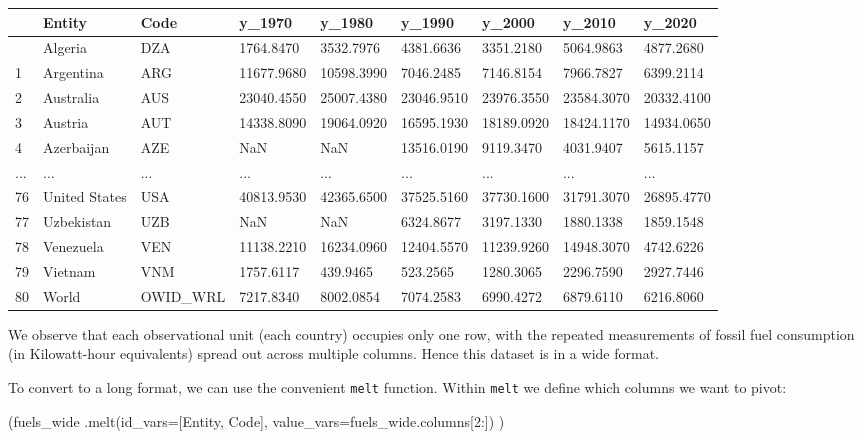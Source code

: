 \documentclass[
  letterpaper,
  DIV=11,
  numbers=noendperiod]{scrreprt}
\newenvironment{Shaded}{\begin{snugshade}}{\end{snugshade}}
\newcommand{\DecValTok}[1]{\textcolor[rgb]{0.68,0.00,0.00}{#1}}
\newcommand{\NormalTok}[1]{\textcolor[rgb]{0.00,0.23,0.31}{#1}}
\newcommand{\OperatorTok}[1]{\textcolor[rgb]{0.37,0.37,0.37}{#1}}
\newcommand{\StringTok}[1]{\textcolor[rgb]{0.13,0.47,0.30}{#1}}
\begin{document}
\begin{longtable}[]{@{}lllllllll@{}}
\toprule\noalign{}
& Entity & Code & y\_1970 & y\_1980 & y\_1990 & y\_2000 & y\_2010 &
y\_2020 \\
\midrule\noalign{}
\endhead
\bottomrule\noalign{}
\endlastfoot
0 & Algeria & DZA & 1764.8470 & 3532.7976 & 4381.6636 & 3351.2180 &
5064.9863 & 4877.2680 \\
1 & Argentina & ARG & 11677.9680 & 10598.3990 & 7046.2485 & 7146.8154 &
7966.7827 & 6399.2114 \\
2 & Australia & AUS & 23040.4550 & 25007.4380 & 23046.9510 & 23976.3550
& 23584.3070 & 20332.4100 \\
3 & Austria & AUT & 14338.8090 & 19064.0920 & 16595.1930 & 18189.0920 &
18424.1170 & 14934.0650 \\
4 & Azerbaijan & AZE & NaN & NaN & 13516.0190 & 9119.3470 & 4031.9407 &
5615.1157 \\
... & ... & ... & ... & ... & ... & ... & ... & ... \\
76 & United States & USA & 40813.9530 & 42365.6500 & 37525.5160 &
37730.1600 & 31791.3070 & 26895.4770 \\
77 & Uzbekistan & UZB & NaN & NaN & 6324.8677 & 3197.1330 & 1880.1338 &
1859.1548 \\
78 & Venezuela & VEN & 11138.2210 & 16234.0960 & 12404.5570 & 11239.9260
& 14948.3070 & 4742.6226 \\
79 & Vietnam & VNM & 1757.6117 & 439.9465 & 523.2565 & 1280.3065 &
2296.7590 & 2927.7446 \\
80 & World & OWID\_WRL & 7217.8340 & 8002.0854 & 7074.2583 & 6990.4272 &
6879.6110 & 6216.8060 \\
\end{longtable}

We observe that each observational unit (each country) occupies only one
row, with the repeated measurements of fossil fuel consumption (in
Kilowatt-hour equivalents) spread out across multiple columns. Hence
this dataset is in a wide format.

To convert to a long format, we can use the convenient \texttt{melt}
function. Within \texttt{melt} we define which columns we want to pivot:

\begin{Shaded}
\begin{Highlighting}[]
\NormalTok{(fuels\_wide}
\NormalTok{ .melt(id\_vars}\OperatorTok{=}\NormalTok{[}\StringTok{\textquotesingle{}Entity\textquotesingle{}}\NormalTok{, }\StringTok{\textquotesingle{}Code\textquotesingle{}}\NormalTok{], }
\NormalTok{       value\_vars}\OperatorTok{=}\NormalTok{fuels\_wide.columns[}\DecValTok{2}\NormalTok{:])}
\NormalTok{)}
\end{Highlighting}
\end{Shaded}
\end{document}

